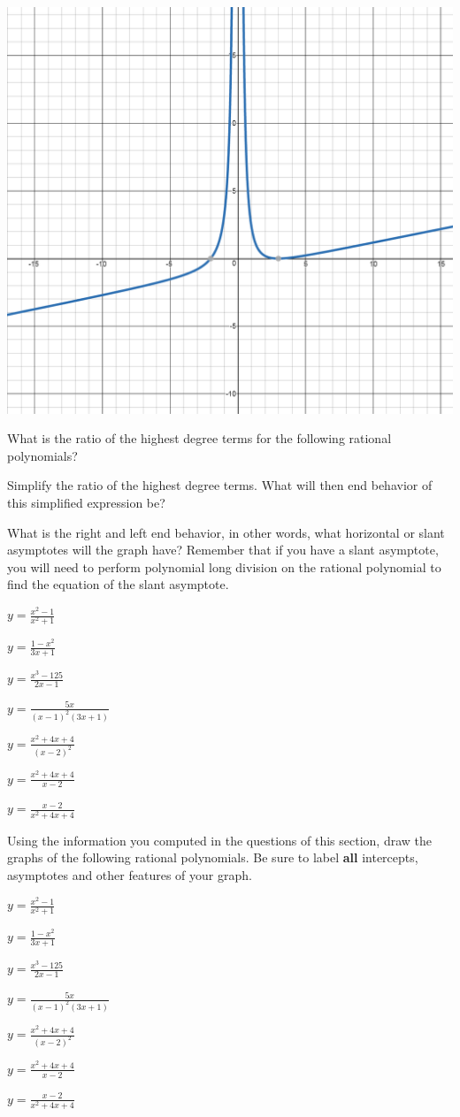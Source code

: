 \begin{center}
\includegraphics[scale=.40]{r5.png} \end{center}

\eq

\bq \be
\item What is the ratio of the highest degree terms for the following rational polynomials?
\item Simplify the ratio of the highest degree terms. What will then end behavior of this simplified expression be?
\item What is the right and left end behavior, in other words, what horizontal or slant asymptotes will the graph have? Remember that if you have a slant asymptote, you will need to perform polynomial long division on the rational polynomial to find the equation of the slant asymptote.
\ee
\be
\item $y=\frac{x^2-1}{x^2+1}$
\item $y=\frac{1-x^2}{3x+1}$
\item $y=\frac{x^3-125}{2x-1}$
\item $y=\frac{5x}{(x-1)^2(3x+1)}$
\item $y=\frac{x^2+4x+4}{(x-2)^2}$
\item $y=\frac{x^2+4x+4}{x-2}$
\item $y=\frac{x-2}{x^2+4x+4}$
\ee
\eq

\bq Using the information you computed in the questions of this section, draw the graphs of the following rational polynomials. Be sure to label \textbf{all} intercepts, asymptotes and other features of your graph.
\be
\item $y=\frac{x^2-1}{x^2+1}$
\item $y=\frac{1-x^2}{3x+1}$
\item $y=\frac{x^3-125}{2x-1}$
\item $y=\frac{5x}{(x-1)^2(3x+1)}$
\item $y=\frac{x^2+4x+4}{(x-2)^2}$
\item $y=\frac{x^2+4x+4}{x-2}$
\item $y=\frac{x-2}{x^2+4x+4}$
\ee
\eq
\newpage


